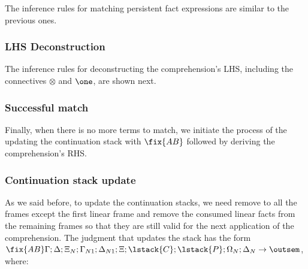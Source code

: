The inference rules for matching persistent fact expressions are similar to the
previous ones.



\subsubsection{LHS Deconstruction}

The inference rules for deconstructing the comprehension's LHS, including the
connectives $\otimes$ and $\one$, are shown next.



\subsubsection{Successful match}

Finally, when there is no more terms to match, we initiate the process of the
updating the continuation stack with $\fix{AB}$ followed by deriving the
comprehension's RHS.



\subsubsection{Continuation stack update}

As we said before, to update the continuation stacks, we need remove to all the
frames except the first linear frame and remove the consumed linear facts from
the remaining frames so that they are still valid for the next application of
the comprehension.  The judgment that updates the stack has the form $\fix{AB}
\Gamma; \Delta; \Xi_N; \Gamma_{N1}; \Delta_{N1}; \Xi; \lstack{C}; \lstack{P}; \Omega_N; \Delta_N
\rightarrow \outsem$, where:

